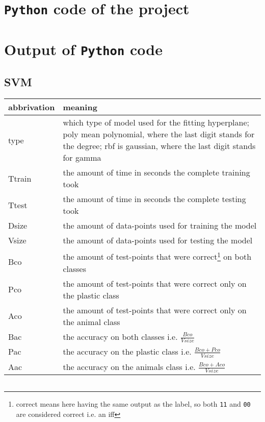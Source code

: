 \vfill



\clearpage

\ifx\showapp\undefined
\begin{appendix}
\renewcommand{\thesubsection}{\thesection.\roman{subsection}}
\renewcommand{\thesubsubsection}{\thesubsection - \arabic{subsubsection}}

\section{\texttt{Python} code of the project}
\label{sec:ap-code}

\section{Output of \texttt{Python} code}
\label{sec:ap-out}

\subsection{SVM}
\begin{tabular}{ p{ } | p{ } }
abbrivation & meaning \\ \hline
type & which type of model used for the fitting hyperplane; poly mean polynomial, where the last digit stands for the degree; rbf is gaussian, where the last digit stands for gamma \\
Ttrain & the amount of time in seconds the complete training took \\
Ttest & the amount of time in seconds the complete testing took \\
Dsize & the amount of data-points used for training the model \\
Vsize & the amount of data-points used for testing the model \\
Bco & the amount of test-points that were correct\footnote{correct means here having the same output as the label, so both \texttt{11} and \texttt{00} are considered correct i.e. an iff} on both classes \\
Pco & the amount of test-points that were correct only on the plastic class \\
Aco & the amount of test-points that were correct only on the animal class \\
Bac & the accuracy on both classes i.e. $\frac{Bco}{Vsize}$ \\
Pac & the accuracy on the plastic class i.e. $\frac{Bco+Pco}{Vsize}$ \\
Aac & the accuracy on the animals class i.e. $\frac{Bco+Aco}{Vsize}$
\end{tabular}
{\small
\begin{longtable}{r|r|r|r|r|r|r|r|r|r|r|r}

\end{longtable}
}

\end{appendix}
\fi